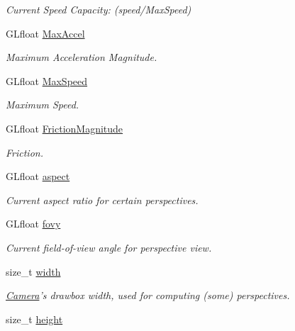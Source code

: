 \begin{DoxyCompactItemize}
\begin{DoxyCompactList}\small\item\em Current Speed Capacity\-: (speed/\-Max\-Speed) \end{DoxyCompactList}\item 
\hypertarget{class_camera_a7817b2e83ad8f783e2822ec7771c6fe9}{G\-Lfloat \hyperlink{class_camera_a7817b2e83ad8f783e2822ec7771c6fe9}{Max\-Accel}}\label{class_camera_a7817b2e83ad8f783e2822ec7771c6fe9}

\begin{DoxyCompactList}\small\item\em Maximum Acceleration Magnitude. \end{DoxyCompactList}\item 
\hypertarget{class_camera_a4e6866298a8e7a1ff2f529202892958e}{G\-Lfloat \hyperlink{class_camera_a4e6866298a8e7a1ff2f529202892958e}{Max\-Speed}}\label{class_camera_a4e6866298a8e7a1ff2f529202892958e}

\begin{DoxyCompactList}\small\item\em Maximum Speed. \end{DoxyCompactList}\item 
G\-Lfloat \hyperlink{class_camera_a4260507a4e59b2b079a0e1c6a5b64d5c}{Friction\-Magnitude}
\begin{DoxyCompactList}\small\item\em Friction. \end{DoxyCompactList}\item 
G\-Lfloat \hyperlink{class_camera_af3fdbc52ba0f7af7d8091986d6303119}{aspect}
\begin{DoxyCompactList}\small\item\em Current aspect ratio for certain perspectives. \end{DoxyCompactList}\item 
G\-Lfloat \hyperlink{class_camera_acc8b97facc57059530efad534c2f8314}{fovy}
\begin{DoxyCompactList}\small\item\em Current field-\/of-\/view angle for perspective view. \end{DoxyCompactList}\item 
\hypertarget{class_camera_ad49d7cc9d3e2f90332702cf67f1d5357}{size\-\_\-t \hyperlink{class_camera_ad49d7cc9d3e2f90332702cf67f1d5357}{width}}\label{class_camera_ad49d7cc9d3e2f90332702cf67f1d5357}

\begin{DoxyCompactList}\small\item\em \hyperlink{class_camera}{Camera}'s drawbox width, used for computing (some) perspectives. \end{DoxyCompactList}\item 
\hypertarget{class_camera_a99ad71730dc8fb068b814ca6328e40fa}{size\-\_\-t \hyperlink{class_camera_a99ad71730dc8fb068b814ca6328e40fa}{height}}\label{class_camera_a99ad71730dc8fb068b814ca6328e40fa}


\end{DoxyCompactItemize}
